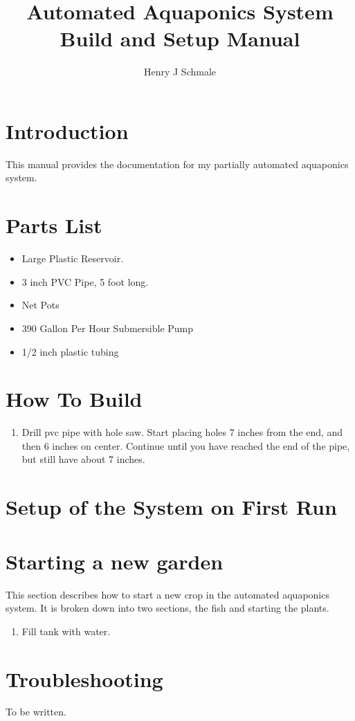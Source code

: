 \documentclass[american,doc,12pt]{apa6}
\title{Automated Aquaponics System Build and Setup Manual}
\author{Henry J Schmale}
\affiliation{Harrisburg University of Science and Technology}
\begin{document}
\maketitle
\tableofcontents

\section{Introduction}
This manual provides the documentation for my partially automated aquaponics
system.

\section{Parts List}
\begin{itemize}
	\item Large Plastic Reservoir.
	\item 3 inch PVC Pipe, 5 foot long.
	\item Net Pots
	\item 390 Gallon Per Hour Submersible Pump
	\item 1/2 inch plastic tubing
\end{itemize}


\section{How To Build}
\begin{enumerate}
	\item Drill pvc pipe with hole saw. Start placing holes 7 inches from the
		  end, and then 6 inches on center. Continue until you have reached
		  the end of the pipe, but still have about 7 inches.
\end{enumerate}


\section{Setup of the System on First Run}



\section{Starting a new garden}
This section describes how to start a new crop in the automated aquaponics
system. It is broken down into two sections, the fish and starting the plants.

\begin{enumerate}
	\item Fill tank with water.
\end{enumerate}



\section{Troubleshooting}
To be written.


\printbibliography
\end{document}
